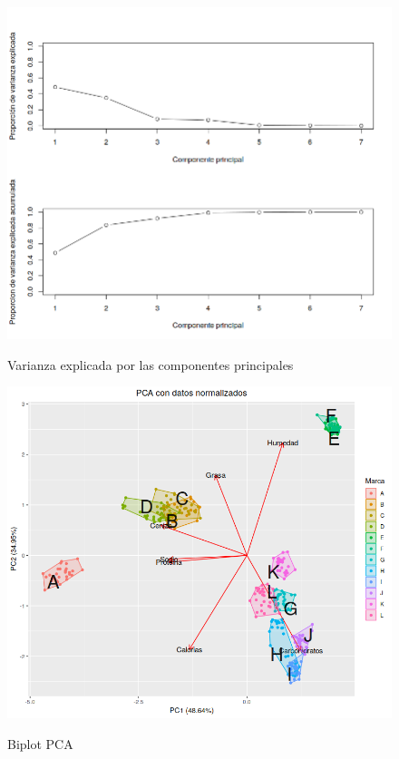 \documentclass[pdf]{beamer}
\begin{document}
\begin{frame}
\begin{figure}[h]
\centering
	\includegraphics[scale=.35]{images/varPCA.png} 
	\label{i_var_PCA}
	\caption{Varianza explicada por las componentes principales}
\end{figure}
\end{frame}


\begin{frame}
\begin{figure}[h]
\centering
	\includegraphics[scale=.35]{images/biplotPCA.png} 
	\label{i_biplot_PCA}
	\caption{Biplot PCA}
\end{figure}
\end{frame}
\end{document}

